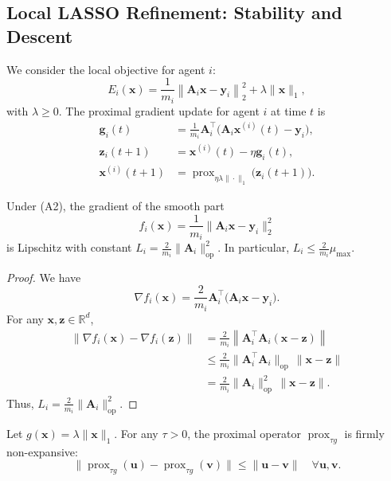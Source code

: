 \documentclass[11pt]{article}
\begin{document}
\subsection{Local LASSO Refinement: Stability and Descent}

We consider the local objective for agent $i$:
\[
  E_i(\bm{x})
  =
  \frac{1}{m_i}
  \left\|
    \bm{A}_i \bm{x} - \bm{y}_i
  \right\|_2^2
  + \lambda \|\bm{x}\|_1,
\]
with $\lambda \geq 0$.
The proximal gradient update for agent $i$ at time $t$ is
\begin{align*}
  \bm{g}_i(t)
    &= \frac{1}{m_i} \bm{A}_i^\top
       \bigl( \bm{A}_i \bm{x}^{(i)}(t) - \bm{y}_i \bigr),
\\
  \bm{z}_i(t+1)
    &= \bm{x}^{(i)}(t) - \eta \bm{g}_i(t),
\\
  \bm{x}^{(i)}(t+1)
    &= \operatorname{prox}_{\eta \lambda \|\cdot\|_1}
       \bigl( \bm{z}_i(t+1) \bigr).
\end{align*}

\begin{lemma}
Under (A2), the gradient of the smooth part
\[
  f_i(\bm{x})
  = \frac{1}{m_i}\bigl\|\bm{A}_i \bm{x} - \bm{y}_i\bigr\|_2^2
\]
is Lipschitz with constant
$L_i = \frac{2}{m_i} \|\bm{A}_i\|_{\mathrm{op}}^2$.
In particular, $L_i \le \frac{2}{m_i} \mu_{\max}$.
\end{lemma}

\begin{proof}
We have
\[
  \nabla f_i(\bm{x})
  = \frac{2}{m_i} \bm{A}_i^\top
    \bigl( \bm{A}_i \bm{x} - \bm{y}_i \bigr).
\]
For any $\bm{x},\bm{z} \in \mathbb{R}^d$,
\begin{align*}
  \|\nabla f_i(\bm{x}) - \nabla f_i(\bm{z})\|
  &=
  \frac{2}{m_i}
  \left\|
    \bm{A}_i^\top \bm{A}_i (\bm{x}-\bm{z})
  \right\|
  \\
  &\le
  \frac{2}{m_i}
  \|\bm{A}_i^\top \bm{A}_i\|_{\mathrm{op}}
  \, \|\bm{x}-\bm{z}\|
  \\
  &=
  \frac{2}{m_i} \|\bm{A}_i\|_{\mathrm{op}}^2
  \, \|\bm{x}-\bm{z}\|.
\end{align*}
Thus, $L_i = \frac{2}{m_i}\|\bm{A}_i\|_{\mathrm{op}}^2$.
\end{proof}

\begin{lemma}
Let $g(\bm{x}) = \lambda \|\bm{x}\|_1$.
For any $\tau > 0$, the proximal operator
$\operatorname{prox}_{\tau g}$ is firmly non-expansive:
\[
  \bigl\|\operatorname{prox}_{\tau g}(\bm{u})
        -\operatorname{prox}_{\tau g}(\bm{v})\bigr\|
  \le
  \|\bm{u}-\bm{v}\|
  \quad \forall \bm{u},\bm{v}.
\]
\end{lemma}
\end{document}
